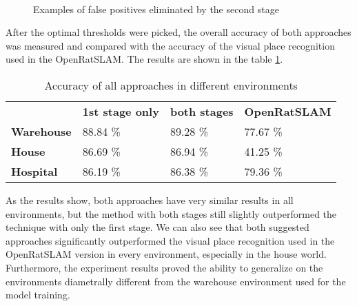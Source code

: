 \begin{figure}[!tbp]
    \centering
    \\
    \caption{Examples of false positives eliminated by the second stage}
    \label{fig:eliminatedFPExamples}
\end{figure}

After the optimal thresholds were picked, the overall accuracy of both approaches was measured and compared with the accuracy of the visual place recognition used in the OpenRatSLAM. The results are shown in the table \ref{tab:accuracy}.

\begin{table}[htpb]
    \caption{Accuracy of all approaches in different environments}\label{tab:accuracy}
    \centering
    \begin{tabular}{l l l l}
        \toprule
        \textbf{}          & \textbf{1st stage only} & \textbf{both stages} & \textbf{OpenRatSLAM} \\
        \textbf{Warehouse} & 88.84 \%                & 89.28 \%             & 77.67 \%             \\
        \textbf{House}     & 86.69 \%                & 86.94 \%             & 41.25 \%             \\
        \textbf{Hospital}  & 86.19 \%                & 86.38 \%             & 79.36 \%             \\
        \bottomrule
    \end{tabular}
\end{table}

As the results show, both approaches have very similar results in all environments, but the method with both stages still slightly outperformed the technique with only the first stage. We can also see that both suggested approaches significantly outperformed the visual place recognition used in the OpenRatSLAM version in every environment, especially in the house world. Furthermore, the experiment results proved the ability to generalize on the environments diametrally different from the warehouse environment used for the model training.
